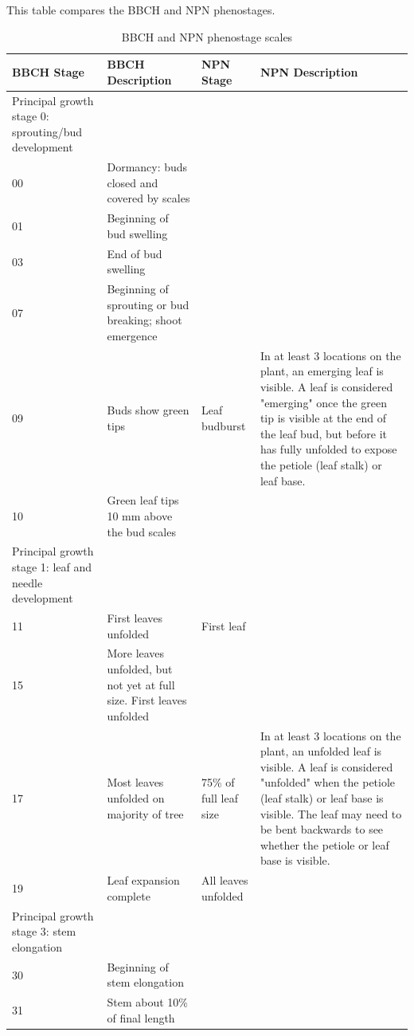\documentclass{article}
\begin{document}
This table compares the BBCH and NPN phenostages.

\begin{landscape}
\setlength\LTcapwidth{\textwidth} 
\setlength\LTleft{0pt}            
\setlength\LTright{0pt}%
\begingroup\footnotesize
\begin{longtable}{p{}p{}|p{}p{}}
\caption{BBCH and NPN phenostage scales} \\ 
  \hline
BBCH Stage & BBCH Description & NPN Stage & NPN Description \\ 
  \hline
Principal growth stage 0: sprouting/bud development &  &  &  \\ 
  00 & Dormancy: buds closed and covered by scales &  &  \\ 
  01 & Beginning of bud swelling &  &  \\ 
  03 & End of bud swelling &  &  \\ 
  07 & Beginning of sprouting or bud breaking; shoot emergence &  &  \\ 
  09 & Buds show green tips & Leaf budburst & In at least 3 locations on the plant, an emerging leaf is visible. A leaf is considered "emerging" once the green tip is visible at the end of the leaf bud, but before it has fully unfolded to expose the petiole (leaf stalk) or leaf base. \\ 
  10 & Green leaf tips 10 mm above the bud scales &  &  \\ 
  Principal growth stage 1: leaf and needle development &  &  &  \\ 
  11 & First leaves unfolded & First leaf &  \\ 
  15 & More leaves unfolded, but not yet at full size. First leaves unfolded &  &  \\ 
  17 & Most leaves unfolded on majority of tree & 75\% of full leaf size & In at least 3 locations on the plant, an unfolded leaf is visible. A leaf is considered "unfolded" when the petiole (leaf stalk) or leaf base is visible. The leaf may need to be bent backwards to see whether the petiole or leaf base is visible. \\ 
  19 & Leaf expansion complete & All leaves unfolded &  \\ 
  Principal growth stage 3: stem elongation &  &  &  \\ 
  30 & Beginning of stem elongation &  &  \\ 
  31 & Stem about 10\% of final length &  &  \\ 

\end{longtable}
\end{landscape}
\end{document}
